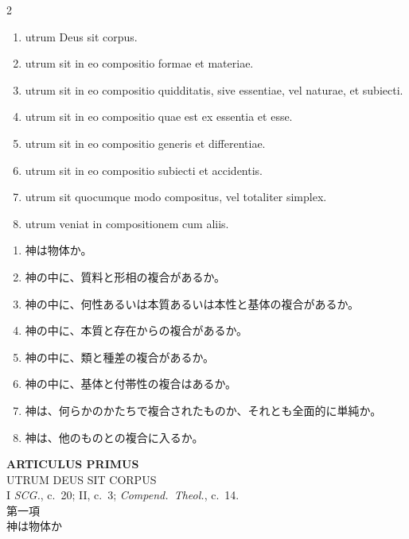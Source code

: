 \documentclass[paper=a4paper,fontsize=10pt,jafontsize=9pt,titlepage]{jlreq}
\begin{document}
\begin{paracol}{2}
\begin{enumerate}
 \item utrum Deus sit corpus.
 \item utrum sit in eo compositio formae et materiae. 
 \item utrum sit in eo compositio quidditatis, sive
essentiae, vel naturae, et subiecti.
 \item utrum sit in eo compositio quae est ex essentia et esse.
 \item utrum sit in eo compositio generis et differentiae. 
 \item utrum sit in eo compositio subiecti et accidentis.
 \item utrum sit quocumque modo compositus, vel totaliter
simplex.
 \item utrum veniat in compositionem cum aliis.
\end{enumerate}

\switchcolumn

\begin{enumerate}
 \item 神は物体か。
 \item 神の中に、質料と形相の複合があるか。
 \item 神の中に、何性あるいは本質あるいは本性と基体の複合があるか。
 \item 神の中に、本質と存在からの複合があるか。
 \item 神の中に、類と種差の複合があるか。
 \item 神の中に、基体と付帯性の複合はあるか。
 \item 神は、何らかのかたちで複合されたものか、それとも全面的に単純か。
 \item 神は、他のものとの複合に入るか。
\end{enumerate}

\end{paracol}

\newpage
{}
{}
\setcounter{section}{1}
\setcounter{subsection}{0}
\begin{center}
 {\Large {\bfseries ARTICULUS PRIMUS}}\\
 {\large UTRUM DEUS SIT CORPUS}\\
 {\footnotesize I {\itshape SCG.}, c.~20; II, c.~3; {\itshape Compend.~Theol.},
 c.~14.}\\
{\Large 第一項\\神は物体か}
\end{center}
\end{document}

